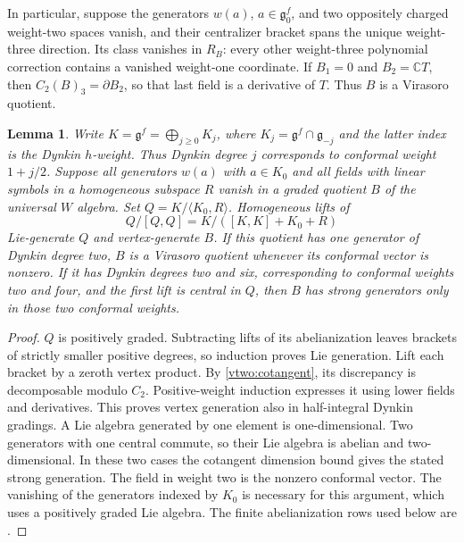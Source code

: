 \documentclass[11pt,a4paper]{amsart}
\numberwithin{equation}{section}
\newtheorem{lemma}[theorem]{Lemma}
\theoremstyle{definition}
\theoremstyle{remark}
\newcommand{\C}{\mathbb C}
\newcommand{\g}{\mathfrak g}
\begin{document}
In particular, suppose the generators $w(a)$, $a\in\g_0^f$,
and two oppositely charged
weight-two spaces vanish, and their centralizer bracket spans the unique
weight-three direction. Its class vanishes in $R_B$: every other
weight-three polynomial correction contains a vanished weight-one
coordinate. If $B_1=0$ and $B_2=\C T$, then
$C_2(B)_3=\partial B_2$, so that last field is a derivative of $T$.
Thus $B$ is a Virasoro quotient.

\begin{lemma}\label{v3:abelianization}
Write $K=\g^f=\bigoplus_{j\ge0}K_j$, where
$K_j=\g^f\cap\g_{-j}$ and the latter index is the Dynkin
$h$-weight. Thus Dynkin degree $j$ corresponds to conformal weight
$1+j/2$.
Suppose all generators $w(a)$ with $a\in K_0$ and all fields
with linear symbols in a homogeneous
subspace $R$ vanish in a graded quotient $B$ of the universal
$W$ algebra. Set $Q=K/\langle K_0,R\rangle$. Homogeneous lifts of
$$
 Q/[Q,Q]=K/([K,K]+K_0+R)
$$
Lie-generate $Q$ and vertex-generate $B$. If this quotient has one
generator of Dynkin degree two, $B$ is a Virasoro quotient whenever its conformal vector is nonzero. If it has Dynkin degrees two and six, corresponding to conformal weights two and four, and the first lift is central
in $Q$, then $B$ has strong generators only in those two conformal weights.
\end{lemma}
\begin{proof}
$Q$ is positively graded. Subtracting lifts of its abelianization leaves
brackets of strictly smaller positive degrees, so induction proves Lie
generation. Lift each bracket by a zeroth vertex product. By
\cref{vtwo:cotangent}, its discrepancy is decomposable modulo $C_2$.
Positive-weight induction expresses it using lower fields and derivatives.
This proves vertex generation also in half-integral Dynkin gradings.
A Lie algebra generated by one element is one-dimensional. Two generators
with one central commute, so their Lie algebra is abelian and
two-dimensional. In these two cases the cotangent dimension bound gives
the stated strong generation. The field in weight two is the nonzero conformal vector. The vanishing of the generators indexed by $K_0$ is necessary for
this argument, which uses a positively graded Lie algebra.
The finite abelianization rows used below are \cite[Tables 7--11]{deGraaf}.
\end{proof}
\end{document}
